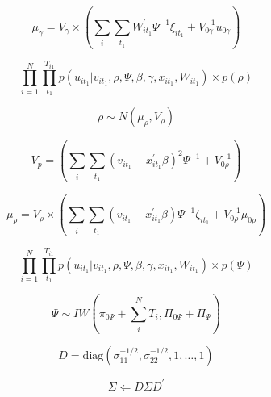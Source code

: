\documentclass[11pt]{jsarticle}
\begin{document}
\begin{equation} \label{formula48}
\mu_{\gamma} = V_{\gamma} \times
\left(
\sum_{\substack{i}} \sum_{\substack{t_{1}}} W^{\prime}_{it_{1}} \Psi^{-1} \xi_{it_{1}} + V^{-1}_{0\gamma} u_{0\gamma}
\right)
\end{equation}

\begin{equation} \label{formula49}
\prod_{i=1}^{N} \prod_{t_{1}}^{T_{i1}} p(u_{it_{1}} | v_{it_{1}}, \rho, \Psi, \beta, \gamma, x_{it_{1}}, W_{it_{1}}) \times p(\rho)
\end{equation}

\begin{equation} \label{formula50}
\rho \sim N(\mu_{\rho}, V_{\rho})
\end{equation}

\begin{equation} \label{formula51}
V_{p} = 
\left(
\sum_{\substack{i}} \sum_{\substack{t_{1}}} (v_{it_{1}} - x^{\prime}_{it_{1}} \beta)^2 \Psi^{-1} + V^{-1}_{0\rho}
\right)
\end{equation}

\begin{equation} \label{formula52}
\mu_{\rho} = V_{\rho} \times 
\left(
\sum_{\substack{i}} \sum_{\substack{t_{1}}} (v_{it_{1}} - x^{\prime}_{it_{1}} \beta) \Psi^{-1} \zeta_{it_{1}} + V^{-1}_{0\rho} \mu_{0\rho}
\right)
\end{equation}

\begin{equation} \label{formula53}
\prod_{i=1}^{N} \prod_{t_{1}}^{T_{i1}} p(u_{it_{1}} | v_{it_{1}}, \rho, \Psi, \beta, \gamma, x_{it_{1}}, W_{it_{1}}) \times p(\Psi)
\end{equation}

\begin{equation} \label{formula54}
\Psi \sim IW
\left(
\pi_{0\Psi} + \sum_{\substack{i}}^{\substack{N}} T_{i}, \Pi_{0\Psi} + \Pi_{\Psi}
\right)
\end{equation}

\begin{equation} \label{formula55}
D = \mbox{diag} (\sigma_{11}^{-1/2}, \sigma_{22}^{-1/2}, 1, \ldots, 1)
\end{equation}

\begin{equation} \label{formula56}
\Sigma \Leftarrow D \Sigma D^{\prime}
\end{equation}

\newpage



\end{document}
